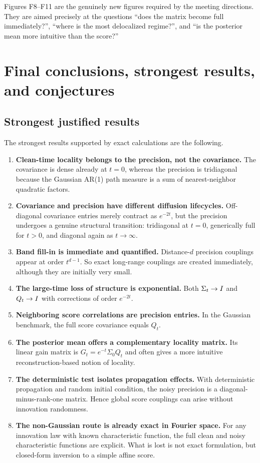 \documentclass[11pt]{article}
\begin{document}
Figures F8--F11 are the genuinely new figures required by the meeting directions. They are aimed precisely at the questions ``does the matrix become full immediately?'', ``where is the most delocalized regime?'', and ``is the posterior mean more intuitive than the score?''

\section{Final conclusions, strongest results, and conjectures}

\subsection{Strongest justified results}

The strongest results supported by exact calculations are the following.

\begin{enumerate}[label=(\arabic*),leftmargin=1cm]
\item \textbf{Clean-time locality belongs to the precision, not the covariance.} The covariance is dense already at $t=0$, whereas the precision is tridiagonal because the Gaussian AR(1) path measure is a sum of nearest-neighbor quadratic factors.
\item \textbf{Covariance and precision have different diffusion lifecycles.} Off-diagonal covariance entries merely contract as $e^{-2t}$, but the precision undergoes a genuine structural transition: tridiagonal at $t=0$, generically full for $t>0$, and diagonal again as $t\to\infty$.
\item \textbf{Band fill-in is immediate and quantified.} Distance-$d$ precision couplings appear at order $t^{d-1}$. So exact long-range couplings are created immediately, although they are initially very small.
\item \textbf{The large-time loss of structure is exponential.} Both $\Sigma_t\to I$ and $Q_t\to I$ with corrections of order $e^{-2t}$.
\item \textbf{Neighboring score correlations are precision entries.} In the Gaussian benchmark, the full score covariance equals $Q_t$.
\item \textbf{The posterior mean offers a complementary locality matrix.} Its linear gain matrix is $G_t=e^{-t}\Sigma_0Q_t$ and often gives a more intuitive reconstruction-based notion of locality.
\item \textbf{The deterministic test isolates propagation effects.} With deterministic propagation and random initial condition, the noisy precision is a diagonal-minus-rank-one matrix. Hence global score couplings can arise without innovation randomness.
\item \textbf{The non-Gaussian route is already exact in Fourier space.} For any innovation law with known characteristic function, the full clean and noisy characteristic functions are explicit. What is lost is not exact formulation, but closed-form inversion to a simple affine score.
\end{enumerate}
\end{document}
